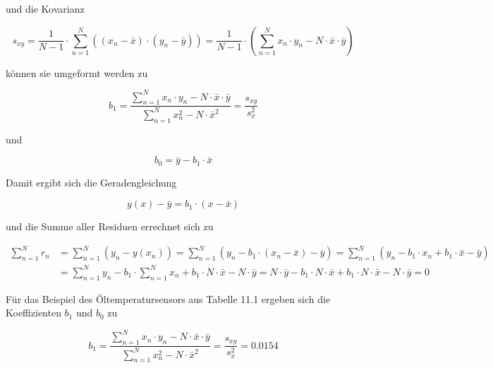 \noindent und die Kovarianz 

\begin{equation}\label{eq:twelveseventeen}
s_{xy} =\dfrac{1}{N-1} \cdot \sum _{n=1}^{N}\left(\left(x_{n} -\bar{x}\right)\cdot \left(y_{n} -\bar{y}\right)\right) =\dfrac{1}{N-1} \cdot \left(\sum _{n=1}^{N}x_{n} \cdot y_{n}  -N\cdot \bar{x}\cdot \bar{y}\right)
\end{equation}

\noindent k\"{o}nnen sie umgeformt werden zu

\begin{equation}\label{eq:twelveeighteen}
b_{1} =\dfrac{\sum _{n=1}^{N}x_{n} \cdot y_{n}  -N\cdot \bar{x}\cdot \bar{y}}{\sum _{n=1}^{N}x_{n}^{2}  -N\cdot \bar{x}^{2} } =\dfrac{s_{xy} }{s_{x}^{2} }
\end{equation}

\noindent und 

\begin{equation}\label{eq:twelvenineteen}
b_{0} =\bar{y}-b_{1} \cdot \bar{x}
\end{equation}

\noindent Damit ergibt sich die Geradengleichung

\begin{equation}\label{eq:twelvetwenty}
y(x)-\bar{y}=b_{1} \cdot (x-\bar{x})
\end{equation}

\noindent und die Summe aller Residuen errechnet sich zu

\begin{equation}\label{eq:twelvetwentyone}
\begin{split}
\sum _{n=1}^{N}r_{n} & = \sum _{n=1}^{N}\left(y_{n} -y(x_{n})\right) =\sum _{n=1}^{N}\left(y_{n} -b_{1} \cdot (x_{n} -\bar{x})-\bar{y}\right) =\sum _{n=1}^{N}\left(y_{n} -b_{1} \cdot x_{n} +b_{1} \cdot \bar{x}-\bar{y}\right) \\ 
& =  \sum _{n=1}^{N}y_{n}-b_{1}\cdot \sum _{n=1}^{N}x_{n}+b_{1}\cdot N \cdot \bar{x}-N\cdot \bar{y} = N\cdot \bar{y} - b_{1}\cdot N\cdot \bar{x}+ b_{1}\cdot N\cdot \bar{x} -N\cdot \bar{y}=0
\end{split}
\end{equation}

\noindent F\"{u}r das Beispiel des \"{O}ltemperatursensors aus Tabelle 11.1 ergeben sich die Koeffizienten $b_{1}$ und $b_{0}$ zu 

\begin{equation}\label{eq:twelvetwentytwo}
b_{1} =\dfrac{\sum _{n=1}^{N}x_{n} \cdot y_{n} -N\cdot \bar{x}\cdot \bar{y}}{\sum _{n=1}^{N}x_{n}^{2} -N\cdot \bar{x}^{2}} =\dfrac{s_{xy}}{s_{x}^{2}} =0.0154
\end{equation}


